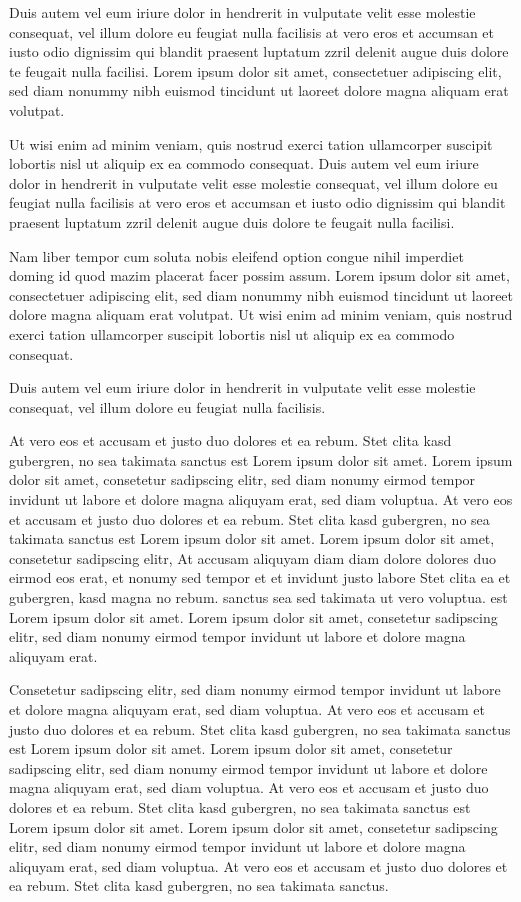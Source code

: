 \documentclass[]{../metanetpaper}
\begin{document}
\begin{Parallel}[c]{80mm}{80mm}
{    Duis autem vel eum iriure dolor in hendrerit in vulputate velit esse molestie consequat, vel illum dolore eu feugiat nulla facilisis at vero eros et accumsan et iusto odio dignissim qui blandit praesent luptatum zzril delenit augue duis dolore te feugait nulla facilisi. Lorem ipsum dolor sit amet, consectetuer adipiscing elit, sed diam nonummy nibh euismod tincidunt ut laoreet dolore magna aliquam erat volutpat.   

    Ut wisi enim ad minim veniam, quis nostrud exerci tation ullamcorper suscipit lobortis nisl ut aliquip ex ea commodo consequat. Duis autem vel eum iriure dolor in hendrerit in vulputate velit esse molestie consequat, vel illum dolore eu feugiat nulla facilisis at vero eros et accumsan et iusto odio dignissim qui blandit praesent luptatum zzril delenit augue duis dolore te feugait nulla facilisi.   

    Nam liber tempor cum soluta nobis eleifend option congue nihil imperdiet doming id quod mazim placerat facer possim assum. Lorem ipsum dolor sit amet, consectetuer adipiscing elit, sed diam nonummy nibh euismod tincidunt ut laoreet dolore magna aliquam erat volutpat. Ut wisi enim ad minim veniam, quis nostrud exerci tation ullamcorper suscipit lobortis nisl ut aliquip ex ea commodo consequat.   

    Duis autem vel eum iriure dolor in hendrerit in vulputate velit esse molestie consequat, vel illum dolore eu feugiat nulla facilisis.   

    At vero eos et accusam et justo duo dolores et ea rebum. Stet clita kasd gubergren, no sea takimata sanctus est Lorem ipsum dolor sit amet. Lorem ipsum dolor sit amet, consetetur sadipscing elitr, sed diam nonumy eirmod tempor invidunt ut labore et dolore magna aliquyam erat, sed diam voluptua. At vero eos et accusam et justo duo dolores et ea rebum. Stet clita kasd gubergren, no sea takimata sanctus est Lorem ipsum dolor sit amet. Lorem ipsum dolor sit amet, consetetur sadipscing elitr, At accusam aliquyam diam diam dolore dolores duo eirmod eos erat, et nonumy sed tempor et et invidunt justo labore Stet clita ea et gubergren, kasd magna no rebum. sanctus sea sed takimata ut vero voluptua. est Lorem ipsum dolor sit amet. Lorem ipsum dolor sit amet, consetetur sadipscing elitr, sed diam nonumy eirmod tempor invidunt ut labore et dolore magna aliquyam erat.   

    Consetetur sadipscing elitr, sed diam nonumy eirmod tempor invidunt ut labore et dolore magna aliquyam erat, sed diam voluptua. At vero eos et accusam et justo duo dolores et ea rebum. Stet clita kasd gubergren, no sea takimata sanctus est Lorem ipsum dolor sit amet. Lorem ipsum dolor sit amet, consetetur sadipscing elitr, sed diam nonumy eirmod tempor invidunt ut labore et dolore magna aliquyam erat, sed diam voluptua. At vero eos et accusam et justo duo dolores et ea rebum. Stet clita kasd gubergren, no sea takimata sanctus est Lorem ipsum dolor sit amet. Lorem ipsum dolor sit amet, consetetur sadipscing elitr, sed diam nonumy eirmod tempor invidunt ut labore et dolore magna aliquyam erat, sed diam voluptua. At vero eos et accusam et justo duo dolores et ea rebum. Stet clita kasd gubergren, no sea takimata sanctus.   

}
\end{Parallel}
\end{document}
